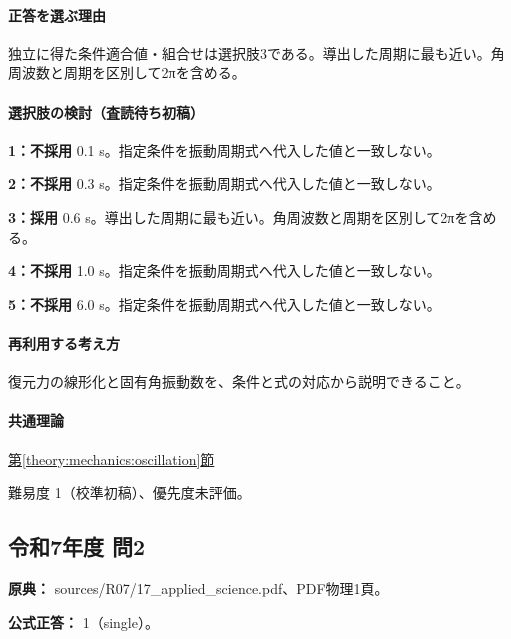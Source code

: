 \paragraph{正答を選ぶ理由} 独立に得た条件適合値・組合せは選択肢3である。導出した周期に最も近い。角周波数と周期を区別して2πを含める。

\paragraph{選択肢の検討（査読待ち初稿）}\mbox{}\par

\noindent\textbf{1：不採用} 0.1 s。指定条件を振動周期式へ代入した値と一致しない。\par

\noindent\textbf{2：不採用} 0.3 s。指定条件を振動周期式へ代入した値と一致しない。\par

\noindent\textbf{3：採用} 0.6 s。導出した周期に最も近い。角周波数と周期を区別して2πを含める。\par

\noindent\textbf{4：不採用} 1.0 s。指定条件を振動周期式へ代入した値と一致しない。\par

\noindent\textbf{5：不採用} 6.0 s。指定条件を振動周期式へ代入した値と一致しない。\par

\paragraph{再利用する考え方} 復元力の線形化と固有角振動数を、条件と式の対応から説明できること。

\paragraph{共通理論} \hyperref[theory:mechanics:oscillation]{第\ref*{theory:mechanics:oscillation}節}

\par 難易度 1（校準初稿）、優先度未評価。

\subsection{令和7年度 問2}
\label{q:r07-reg-applied-02}

\noindent\textbf{原典：} sources/R07/17\_applied\_science.pdf、PDF物理1頁。

\textbf{公式正答：} 1（single）。

